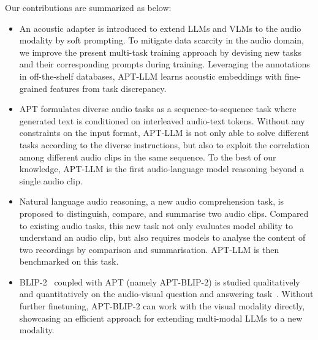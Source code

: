 Our contributions are summarized as below:
\begin{itemize}
    \item An acoustic adapter is introduced to extend LLMs and VLMs to the audio modality by soft prompting. To mitigate data scarcity in the audio domain, we improve the present multi-task training approach by devising new tasks and their corresponding prompts during training. Leveraging the annotations in off-the-shelf databases, APT-LLM learns acoustic embeddings with fine-grained features from task discrepancy.
    
    \item APT formulates diverse audio tasks as a sequence-to-sequence task where generated text is conditioned on interleaved audio-text tokens. Without any constraints on the input format, APT-LLM is not only able to solve different tasks according to the diverse instructions, but also to exploit the correlation among different audio clips in the same sequence. To the best of our knowledge, APT-LLM is the first audio-language model reasoning beyond a single audio clip.
    
    \item Natural language audio reasoning, a new audio comprehension task, is proposed to distinguish, compare, and summarise two audio clips. Compared to existing audio tasks, this new task not only evaluates model ability to understand an audio clip, but also requires models to analyse the content of two recordings by comparison and summarisation. APT-LLM is then benchmarked on this task.
    
    \item BLIP-2~\citep{li_blip-2_2023} coupled with APT (namely APT-BLIP-2) is studied qualitatively and quantitatively on the audio-visual question and answering task~\citep{yang_avqa_2022}. Without further finetuning, APT-BLIP-2 can work with the visual modality directly, showcasing an efficient approach for extending multi-modal LLMs to a new modality.

\end{itemize}
